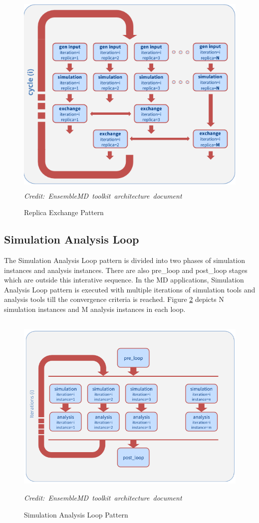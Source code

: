 \documentclass[10pt]{ruthesis}
\begin{document}
\begin{figure}
  \centering
  \includegraphics[width=13cm,height=10cm]{repex.png}
  \hbox{\small\itshape Credit: EnsembleMD toolkit architecture document \cite{site1}}
  \caption{Replica Exchange Pattern}
  \label{fig:repex1}
\end{figure}

\subsection{Simulation Analysis Loop}
The Simulation Analysis Loop pattern is divided into two phases of simulation instances and analysis instances. There are also pre\_loop and post\_loop stages which are outside this interative sequence. In the MD applications, Simulation Analysis Loop pattern is executed with multiple iterations of simulation tools and analysis tools till the convergence criteria is reached. Figure \ref{fig:sal} depicts N simulation instances and M analysis instances in each loop.

\begin{figure}
  \centering
  \includegraphics[width=12cm,height=9cm]{sal.png}
  \hbox{\small\itshape Credit: EnsembleMD toolkit architecture document \cite{site1}}
  \caption{Simulation Analysis Loop Pattern}
  \label{fig:sal}
\end{figure}
\end{document}
